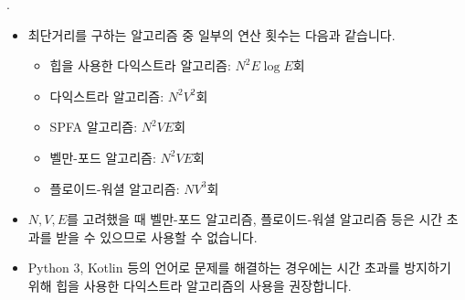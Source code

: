 	\begin{frame}{\textbf{\probidx}. \probname}
		\begin{itemize}
			\item 최단거리를 구하는 알고리즘 중 일부의 연산 횟수는 다음과 같습니다.
			\begin{itemize}
				\item 힙을 사용한 다익스트라 알고리즘: $N^2E\log E$회
				\item {} 다익스트라 알고리즘: $N^2V^2$회
				\item SPFA 알고리즘: $N^2VE$회
				\item 벨만-포드 알고리즘: $N^2VE$회
				\item 플로이드-워셜 알고리즘: $NV^3$회
			\end{itemize}
			\item $N, V, E$를 고려했을 때 벨만-포드 알고리즘, 플로이드-워셜 알고리즘 등은 시간 초과를 받을 수 있으므로 사용할 수 없습니다.
			\item Python 3, Kotlin 등의 언어로 문제를 해결하는 경우에는 시간 초과를 방지하기 위해 힙을 사용한 다익스트라 알고리즘의 사용을 권장합니다.
		\end{itemize}
	\end{frame}

